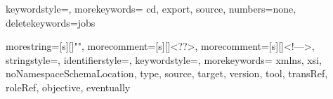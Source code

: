 
\usepackage{color}



{
  keywordstyle=\color{blue},
  morekeywords={
    cd,
    export,
    source},
  numbers=none,
  deletekeywords={jobs}
}


{
  morestring=[s][\color{purple}]{"}{"},
  morecomment=[s][\color{green}]{<?}{?>},
  morecomment=[s][\color{green}]{<!--}{-->},
  stringstyle=\color{black},
  identifierstyle=\color{blue},
  keywordstyle=\color{red},
  morekeywords={
    xmlns,
    xsi,
    noNamespaceSchemaLocation,
    type,
    source,
    target,
    version,
    tool,
    transRef,
    roleRef,
    objective,
    eventually}
}

